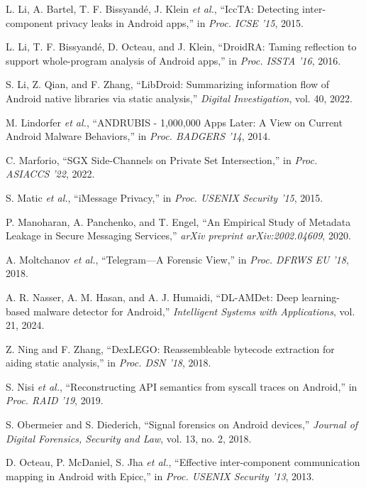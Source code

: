 \documentclass[a4paper,12pt]{report}
\begin{document}
\begin{thebibliography}{99}
L. Li, A. Bartel, T. F. Bissyandé, J. Klein \emph{et al.}, “IccTA: Detecting inter-component privacy leaks in Android apps,” in \emph{Proc. ICSE ’15}, 2015.

L. Li, T. F. Bissyandé, D. Octeau, and J. Klein, “DroidRA: Taming reflection to support whole-program analysis of Android apps,” in \emph{Proc. ISSTA '16}, 2016.

S. Li, Z. Qian, and F. Zhang, “LibDroid: Summarizing information flow of Android native libraries via static analysis,” \emph{Digital Investigation}, vol. 40, 2022.

M. Lindorfer \emph{et al.}, “ANDRUBIS - 1,000,000 Apps Later: A View on Current Android Malware Behaviors,” in \emph{Proc. BADGERS '14}, 2014.

C. Marforio, “SGX Side-Channels on Private Set Intersection,” in \emph{Proc. ASIACCS '22}, 2022.

S. Matic \emph{et al.}, “iMessage Privacy,” in \emph{Proc. USENIX Security '15}, 2015.

P. Manoharan, A. Panchenko, and T. Engel, “An Empirical Study of Metadata Leakage in Secure Messaging Services,” \emph{arXiv preprint arXiv:2002.04609}, 2020.

A. Moltchanov \emph{et al.}, “Telegram—A Forensic View,” in \emph{Proc. DFRWS EU '18}, 2018.

A. R. Nasser, A. M. Hasan, and A. J. Humaidi, “DL-AMDet: Deep learning-based malware detector for Android,” \emph{Intelligent Systems with Applications}, vol. 21, 2024.

Z. Ning and F. Zhang, “DexLEGO: Reassembleable bytecode extraction for aiding static analysis,” in \emph{Proc. DSN '18}, 2018.

S. Nisi \emph{et al.}, “Reconstructing API semantics from syscall traces on Android,” in \emph{Proc. RAID '19}, 2019.

S. Obermeier and S. Diederich, “Signal forensics on Android devices,” \emph{Journal of Digital Forensics, Security and Law}, vol. 13, no. 2, 2018.

D. Octeau, P. McDaniel, S. Jha \emph{et al.}, “Effective inter-component communication mapping in Android with Epicc,” in \emph{Proc. USENIX Security '13}, 2013.


\end{thebibliography}
\end{document}

